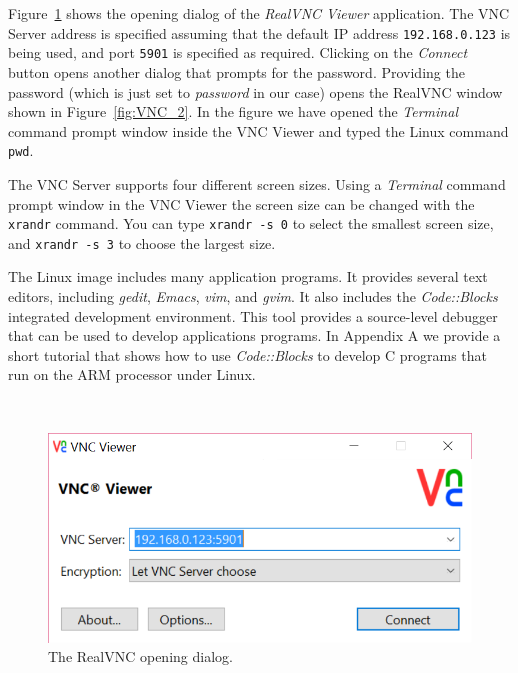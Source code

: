 \documentclass[11pt, twoside, pdftex]{article}
\begin{document}
Figure~\ref{fig:VNC_1} shows the opening dialog of the {\it RealVNC Viewer} application. 
The VNC Server address is specified assuming that the default IP address
\texttt{192.168.0.123} is being used, and port \texttt{5901} is specified as required. Clicking 
on the {\it Connect} button opens another dialog that prompts for the 
password. Providing the password (which is just set to {\it password} in our case) opens the 
RealVNC window shown in Figure~\ref{fig:VNC_2}. In the figure we have opened the {\it Terminal}
command prompt window inside the VNC Viewer and typed the Linux command \texttt{pwd}.

The VNC Server supports four different screen sizes. Using a {\it Terminal} command prompt 
window in the VNC Viewer the screen size can be changed with the \texttt{xrandr} command. 
You can type \texttt{xrandr~-s~0} to select the smallest screen size, and \texttt{xrandr -s 3}
to choose the largest size.

The Linux image includes many application programs. It provides several text
editors, including {\it gedit}, {\it Emacs}, {\it vim}, and {\it gvim}.  It also includes
the {\it Code::Blocks} integrated development environment. This tool provides a 
source-level debugger that can be used to develop applications programs. In
Appendix A we provide a short tutorial that shows how to use {\it Code::Blocks} to develop
C programs that run on the ARM processor under Linux. 

~\\
\begin{figure}[H]
   \begin{center}
       \includegraphics[scale=0.5]{figures/VNC_1}
   \end{center}
   \caption{The RealVNC opening dialog.}
	\label{fig:VNC_1}
\end{figure}
\end{document}

